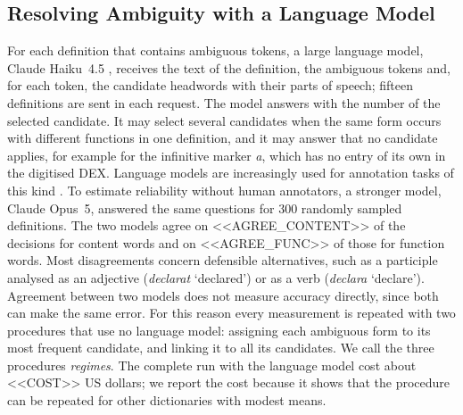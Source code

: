 \documentclass[11pt]{article}
\newcommand{\ro}[1]{\textit{#1}}
\begin{document}
\subsection{Resolving Ambiguity with a Language Model}
For each definition that contains ambiguous tokens, a large language model, Claude Haiku~4.5 \cite{anthropic_models}, receives the text of the definition, the ambiguous tokens and, for each token, the candidate headwords with their parts of speech; fifteen definitions are sent in each request. The model answers with the number of the selected candidate. It may select several candidates when the same form occurs with different functions in one definition, and it may answer that no candidate applies, for example for the infinitive marker \ro{a}, which has no entry of its own in the digitised DEX. Language models are increasingly used for annotation tasks of this kind \cite{gilardi2023}. To estimate reliability without human annotators, a stronger model, Claude Opus~5, answered the same questions for 300 randomly sampled definitions. The two models agree on <<AGREE_CONTENT>> of the decisions for content words and on <<AGREE_FUNC>> of those for function words. Most disagreements concern defensible alternatives, such as a participle analysed as an adjective (\ro{declarat} `declared') or as a verb (\ro{declara} `declare'). Agreement between two models does not measure accuracy directly, since both can make the same error. For this reason every measurement is repeated with two procedures that use no language model: assigning each ambiguous form to its most frequent candidate, and linking it to all its candidates. We call the three procedures \emph{regimes}. The complete run with the language model cost about <<COST>> US dollars; we report the cost because it shows that the procedure can be repeated for other dictionaries with modest means.
\end{document}
